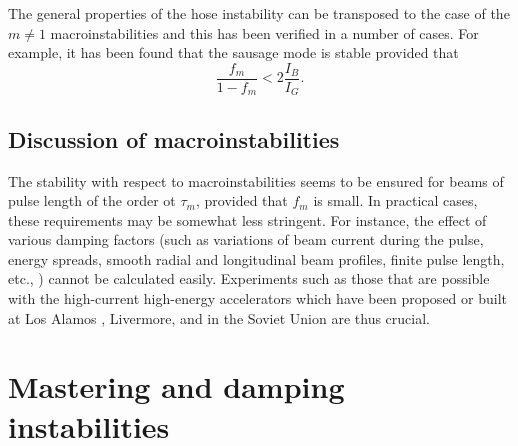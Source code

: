 \documentclass [12pt,a4paper,     ]{report} %
\begin{document}
	The general properties of the hose instability can be transposed to the case of the $m\neq 1$ macroinstabilities and this has been verified in a number of cases.  For example, it has been found that the sausage mode is stable provided that \cite{LAMPE1981-}
%
\begin{equation}\label{mac:39} %
                 \frac{f_m}{1-f_m} < 2 \frac{I_B}{I_G}.
\end{equation}
%


\subsection{Discussion of macroinstabilities}

	The stability with respect to macroinstabilities seems to be ensured for beams of pulse length of the order ot $\tau_m$, provided that $f_m$ is small.  In practical cases, these requirements may be somewhat less stringent.  For instance, the effect of various damping factors (such as variations of beam current during the pulse, energy spreads, smooth radial and longitudinal beam profiles, finite pulse length, etc., \cite{BEAL-1972-}) cannot be calculated easily.  Experiments such as those that are possible with the high-current high-energy accelerators which have been proposed or built at Los Alamos \cite{MOIR-1981-}, Livermore, \cite{BARLE1981A} and in the Soviet Union \cite{PAVLO1980-} are thus crucial.



\section{Mastering and damping instabilities}
\label{mas:0}
\end{document}
